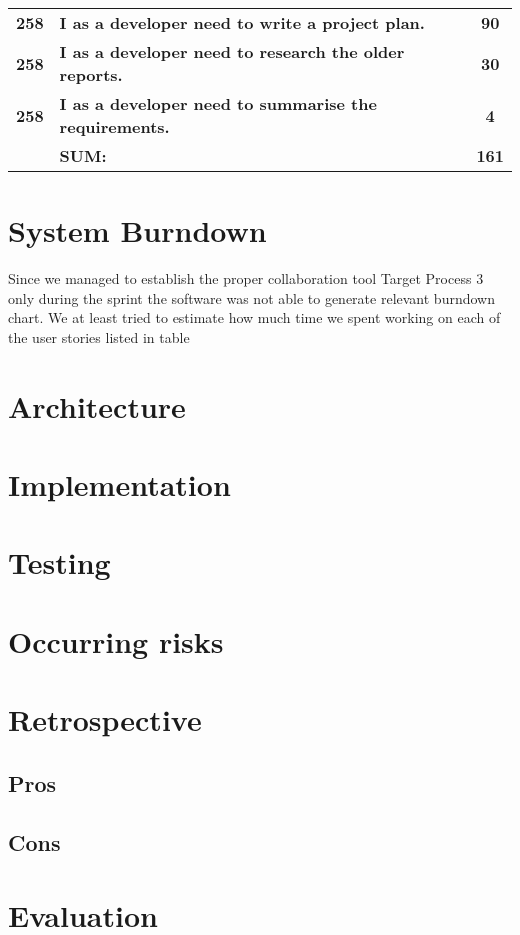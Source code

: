 \begin{table*}[!h]
\begin{tabularx}{\textwidth}{cXcc}
\textbf{258} 	& \textbf{I as a developer need to write a project plan.} 						&  			& \textbf{90} \\

\textbf{258} 	& \textbf{I as a developer need to research the older reports.} 						&  			& \textbf{30} \\

\textbf{258} 	& \textbf{I as a developer need to summarise the requirements.} 						&  			& \textbf{4} \\
\midrule
				& \textbf{SUM:}		&			& \textbf{161}
 \\																			
\bottomrule[1mm]

\end{tabularx}
\end{table*}

\section{System Burndown}
Since we managed to establish the proper collaboration tool Target Process 3 only during the sprint the software was not able to generate relevant burndown chart. We at least tried to estimate how much time we spent working on each of the user stories listed in table



\section{Architecture}
\section{Implementation}
\section{Testing}
\section{Occurring risks}
\section{Retrospective}
\subsection{Pros}
\subsection{Cons}
\section{Evaluation}